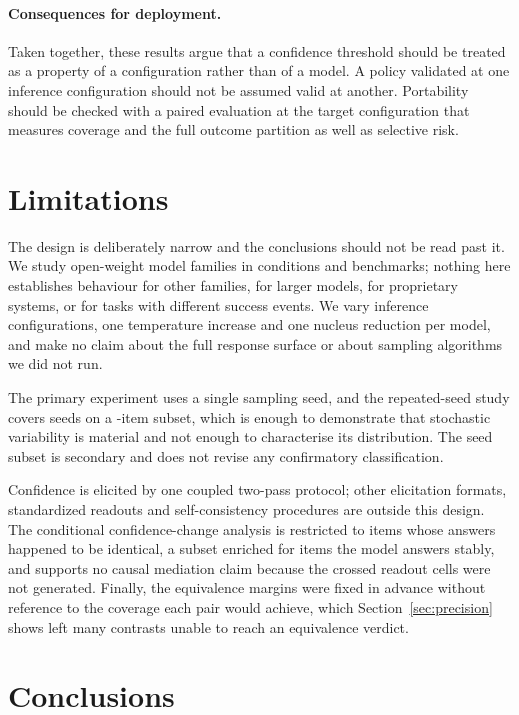 \documentclass[information,article,submit,moreauthors]{Definitions/mdpi}
\begin{document}
\paragraph{Consequences for deployment.}
Taken together, these results argue that a confidence threshold should be
treated as a property of a configuration rather than of a model. A policy
validated at one inference configuration should not be assumed valid at
another. Portability should be checked with a paired evaluation at the target
configuration that measures coverage and the full outcome partition as well as
selective risk.

\section{Limitations}

The design is deliberately narrow and the conclusions should not be read past
it. We study \NumModelFamilies{} open-weight model families in
\NumModelsConditions{} conditions and \NumDatasets{} benchmarks; nothing here
establishes behaviour for other families, for larger models, for proprietary
systems, or for tasks with different success events. We vary
\NumCoordinates{} inference configurations, one temperature increase and one nucleus
reduction per model, and make no claim about the full response surface or about
sampling algorithms we did not run.

The primary experiment uses a single sampling seed, and the repeated-seed study
covers \NumSeeds{} seeds on a \SeedSubsetItems{}-item subset, which is enough to
demonstrate that stochastic variability is material and not enough to
characterise its distribution. The seed subset is secondary and does not revise
any confirmatory classification.

Confidence is elicited by one coupled two-pass protocol; other elicitation
formats, standardized readouts and self-consistency procedures are outside this
design. The conditional confidence-change analysis is restricted to items whose
answers happened to be identical, a subset enriched for items the model answers
stably, and supports no causal mediation claim because the crossed readout cells
were not generated. Finally, the equivalence margins were fixed in advance
without reference to the coverage each pair would achieve, which
Section~\ref{sec:precision} shows left many contrasts unable to reach an
equivalence verdict.

\section{Conclusions}
\end{document}
